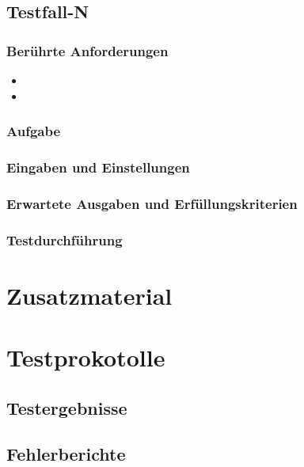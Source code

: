 \section{Testfall-N}
\label{std:testfall-n}

\subsection{Berührte Anforderungen}
\label{std:testfall-n-anforderungen-beruehrt}

\begin{itemize}
\item {}
\item {}
\end{itemize}

\subsection{Aufgabe}
\label{std:testfall-n-aufgabe}

\subsection{Eingaben und Einstellungen}
\label{std:testfall-n-eingaben}

\subsection{Erwartete Ausgaben und Erfüllungskriterien}
\label{std:testfall-n-ausgaben-erwartet}

\subsection{Testdurchführung}
\label{std:testfall-n-durchfuehrung}


\chapter{Zusatzmaterial}
\label{std:zusatzmaterial}

\appendix
\chapter{Testprokotolle}
\label{std:appx-testprotokolle}

\section{Testergebnisse}
\label{std:testergebnisse}

\section{Fehlerberichte}
\label{std:fehlerberichte}

